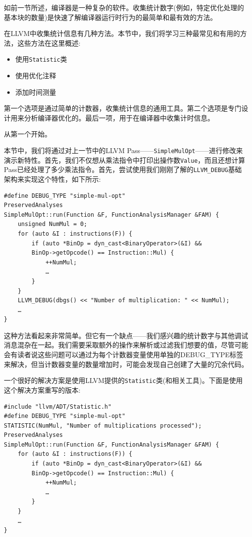 
如前一节所述，编译器是一种复杂的软件。收集统计数字(例如，特定优化处理的基本块的数量)是快速了解编译器运行时行为的最简单和最有效的方法。

在LLVM中收集统计信息有几种方法。本节中，我们将学习三种最常见和有用的方法，这些方法在这里概述:

\begin{itemize}
\item 使用\texttt{Statistic}类
\item 使用优化注释
\item 添加时间测量
\end{itemize}

第一个选项是通过简单的计数器，收集统计信息的通用工具。第二个选项是专门设计用来分析编译器优化的。最后一项，用于在编译器中收集计时信息。

从第一个开始。


本节中，我们将通过对上一节中的LLVM Pass——\texttt{SimpleMulOpt}——进行修改来演示新特性。首先，我们不仅想从乘法指令中打印出操作数\texttt{Value}，而且还想计算Pass已经处理了多少乘法指令。首先，尝试使用我们刚刚了解的\texttt{LLVM\_DEBUG}基础架构来实现这个特性，如下所示:

\begin{lstlisting}[style=styleCXX]
#define DEBUG_TYPE "simple-mul-opt"
PreservedAnalyses
SimpleMulOpt::run(Function &F, FunctionAnalysisManager &FAM) {
	unsigned NumMul = 0;
	for (auto &I : instructions(F)) {
		if (auto *BinOp = dyn_cast<BinaryOperator>(&I) &&
		BinOp->getOpcode() == Instruction::Mul) {
			++NumMul;
			…
		}
	}
	LLVM_DEBUG(dbgs() << "Number of multiplication: " << NumMul);
	…
}
\end{lstlisting}

这种方法看起来非常简单。但它有一个缺点——我们感兴趣的统计数字与其他调试消息混杂在一起。我们需要采取额外的操作来解析或过滤我们想要的值，尽管可能会有读者说这些问题可以通过为每个计数器变量使用单独的DEBUG\_TYPE标签来解决，但当计数器变量的数量增加时，可能会发现自己创建了大量的冗余代码。

一个很好的解决方案是使用LLVM提供的\texttt{Statistic}类(和相关工具)。下面是使用这个解决方案重写的版本:

\begin{lstlisting}[style=styleCXX]
#include "llvm/ADT/Statistic.h"
#define DEBUG_TYPE "simple-mul-opt"
STATISTIC(NumMul, "Number of multiplications processed");
PreservedAnalyses
SimpleMulOpt::run(Function &F, FunctionAnalysisManager &FAM) {
	for (auto &I : instructions(F)) {
		if (auto *BinOp = dyn_cast<BinaryOperator>(&I) &&
		BinOp->getOpcode() == Instruction::Mul) {
			++NumMul;
			…
		}
	}
	…
}
\end{lstlisting}

